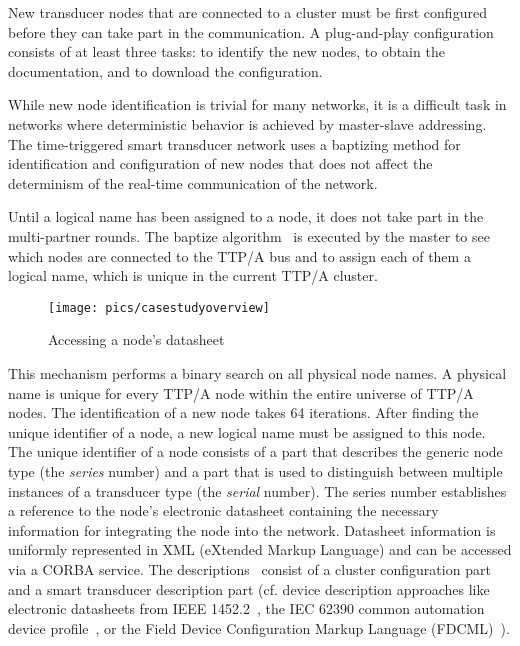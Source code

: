 \documentclass[11pt,a4paper,]{article}
\def\TTPA{TTP/A}
\begin{document}
New transducer nodes that are connected to a cluster must be first
configured before they can take part in the communication. A
plug-and-play configuration consists of at least three tasks: to
identify the new nodes, to obtain the documentation, and to
download the configuration.

While new node identification is trivial for many networks, it is
a difficult task in networks where deterministic behavior is
achieved by master-slave addressing. The time-triggered smart
transducer network uses a baptizing method for identification and
configuration of new nodes that does not affect the determinism of
the real-time communication of the network.

Until a logical name has been assigned to a node, it does not take
part in the multi-partner rounds. The baptize
algorithm~\cite{elmenreich:2002-5} is executed by the master to
see which nodes are connected to the {\TTPA} bus and to assign
each of them a logical name, which is unique in the current
{\TTPA} cluster.

\begin{figure}[t]
  \centerline{\texttt{[image: pics/casestudyoverview]}}
    \caption{Accessing a node's datasheet}
    \label{fig:datasheet}
\end{figure}


This mechanism performs a binary search on all physical node names.
A physical name is unique for every {\TTPA} node within the entire
universe of {\TTPA} nodes. The identification of a new node takes 64
iterations. After finding the unique identifier of a node, a new
logical name must be assigned to this node. The unique identifier of
a node consists of a part that describes the generic node type (the
{\em series} number) and a part that is used to distinguish between
multiple instances of a transducer type (the {\em serial} number).
The series number establishes a reference to the node's electronic
datasheet containing the necessary information for integrating the
node into the network. Datasheet information is uniformly
represented in XML (eXtended Markup Language) and can be accessed via a CORBA service. The
descriptions~\cite{pitzek:2003-6} consist of a cluster configuration
part and a smart transducer description part (cf. device description
approaches like electronic datasheets from IEEE
1452.2~\cite{ieee1451-2spec}, the IEC 62390 common automation device
profile~\cite{iec-62390}, or the Field Device Configuration Markup
Language (FDCML)~\cite{fdcml-spec}).
\end{document}
